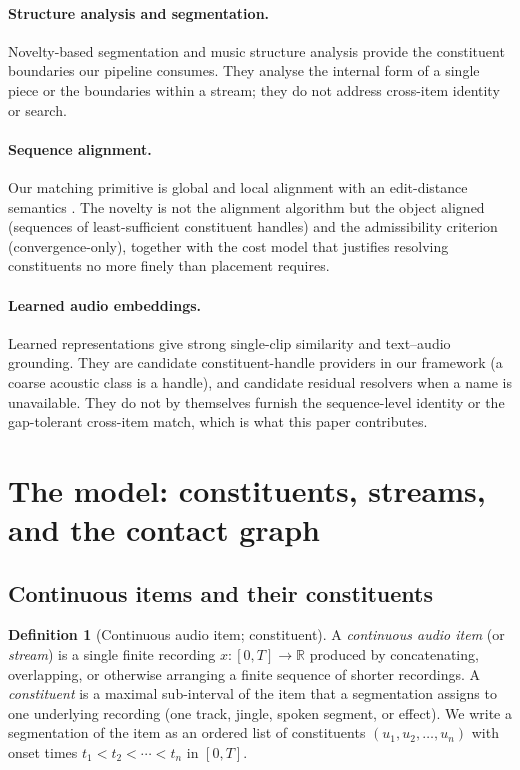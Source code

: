 \documentclass[11pt,twocolumn,a4paper]{article}
\theoremstyle{thmstyle}
\theoremstyle{definition}
\newtheorem{definition}[theorem]{Definition}
\theoremstyle{remark}
\newcommand{\R}{\mathbb{R}}
\begin{document}
\paragraph{Structure analysis and segmentation.}
Novelty-based segmentation and music structure analysis
\citep{foote2000segmentation,paulus2010structure} provide the constituent
boundaries our pipeline consumes. They analyse the internal form of a single
piece or the boundaries within a stream; they do not address cross-item
identity or search.

\paragraph{Sequence alignment.}
Our matching primitive is global and local alignment
\citep{needleman1970,smith1981} with an edit-distance semantics
\citep{levenshtein1966}. The novelty is not the alignment algorithm but the
object aligned (sequences of least-sufficient constituent handles) and the
admissibility criterion (convergence-only), together with the cost model that
justifies resolving constituents no more finely than placement requires.

\paragraph{Learned audio embeddings.}
Learned representations \citep{elizalde2023clap,mccallum2022supervised} give
strong single-clip similarity and text--audio grounding. They are candidate
constituent-handle providers in our framework (a coarse acoustic class is a
handle), and candidate residual resolvers when a name is unavailable. They do
not by themselves furnish the sequence-level identity or the gap-tolerant
cross-item match, which is what this paper contributes.

\section{The model: constituents, streams, and the contact graph}
\label{sec:model}

\subsection{Continuous items and their constituents}

\begin{definition}[Continuous audio item; constituent]
\label{def:item}
A \emph{continuous audio item} (or \emph{stream}) is a single finite recording
$x\colon[0,T]\to\R$ produced by concatenating, overlapping, or otherwise
arranging a finite sequence of shorter recordings. A \emph{constituent} is a
maximal sub-interval of the item that a segmentation assigns to one underlying
recording (one track, jingle, spoken segment, or effect). We write a
segmentation of the item as an ordered list of constituents
$(u_1,u_2,\dots,u_n)$ with onset times $t_1<t_2<\cdots<t_n$ in $[0,T]$.
\end{definition}
\end{document}
